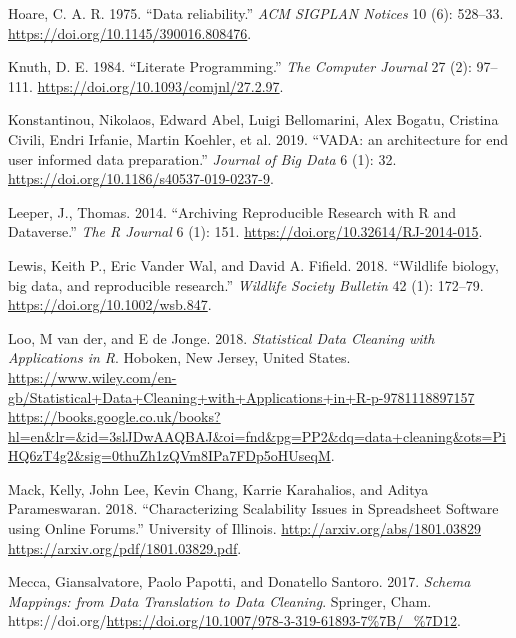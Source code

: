 \documentclass[
]{article}
\newlength{\cslhangindent}
\newlength{\cslentryspacingunit} %
\newenvironment{CSLReferences}[2] %
 {%
  \setlength{\parindent}{0pt}
  \ifodd #1
  \let\oldpar\par
  \def\par{\hangindent=\cslhangindent\oldpar}
  \fi
  \setlength{\parskip}{#2\cslentryspacingunit}
 }%
 {}
\begin{document}
\begin{CSLReferences}{1}{0}
\leavevmode{}%
Hoare, C. A. R. 1975. {``{Data reliability}.''} \emph{ACM SIGPLAN
Notices} 10 (6): 528--33. \url{https://doi.org/10.1145/390016.808476}.

\leavevmode{}%
Knuth, D. E. 1984. {``{Literate Programming}.''} \emph{The Computer
Journal} 27 (2): 97--111. \url{https://doi.org/10.1093/comjnl/27.2.97}.

\leavevmode{}%
Konstantinou, Nikolaos, Edward Abel, Luigi Bellomarini, Alex Bogatu,
Cristina Civili, Endri Irfanie, Martin Koehler, et al. 2019. {``{VADA:
an architecture for end user informed data preparation}.''}
\emph{Journal of Big Data} 6 (1): 32.
\url{https://doi.org/10.1186/s40537-019-0237-9}.

\leavevmode{}%
Leeper, J., Thomas. 2014. {``{Archiving Reproducible Research with R and
Dataverse}.''} \emph{The R Journal} 6 (1): 151.
\url{https://doi.org/10.32614/RJ-2014-015}.

\leavevmode{}%
Lewis, Keith P., Eric Vander Wal, and David A. Fifield. 2018.
{``{Wildlife biology, big data, and reproducible research}.''}
\emph{Wildlife Society Bulletin} 42 (1): 172--79.
\url{https://doi.org/10.1002/wsb.847}.

\leavevmode{}%
Loo, M van der, and E de Jonge. 2018. \emph{{Statistical Data Cleaning
with Applications in R}}. Hoboken, New Jersey, United States.
\href{https://www.wiley.com/en-gb/Statistical+Data+Cleaning+with+Applications+in+R-p-9781118897157\%20https://books.google.co.uk/books?hl=en\&lr=\&id=3slJDwAAQBAJ\&oi=fnd\&pg=PP2\&dq=data+cleaning\&ots=PiHQ6zT4g2\&sig=0thuZh1zQVm8IPa7FDp5oHUseqM}{https://www.wiley.com/en-gb/Statistical+Data+Cleaning+with+Applications+in+R-p-9781118897157
https://books.google.co.uk/books?hl=en\&lr=\&id=3slJDwAAQBAJ\&oi=fnd\&pg=PP2\&dq=data+cleaning\&ots=PiHQ6zT4g2\&sig=0thuZh1zQVm8IPa7FDp5oHUseqM}.

\leavevmode{}%
Mack, Kelly, John Lee, Kevin Chang, Karrie Karahalios, and Aditya
Parameswaran. 2018. {``{Characterizing Scalability Issues in Spreadsheet
Software using Online Forums}.''} University of Illinois.
\href{http://arxiv.org/abs/1801.03829\%20https://arxiv.org/pdf/1801.03829.pdf}{http://arxiv.org/abs/1801.03829
https://arxiv.org/pdf/1801.03829.pdf}.

\leavevmode{}%
Mecca, Giansalvatore, Paolo Papotti, and Donatello Santoro. 2017.
\emph{{Schema Mappings: from Data Translation to Data Cleaning}}.
Springer, Cham.
https://doi.org/\url{https://doi.org/10.1007/978-3-319-61893-7\%7B/_\%7D12}.


\end{CSLReferences}
\end{document}
